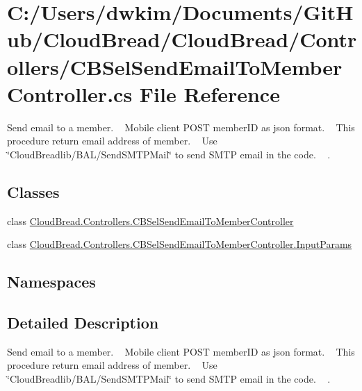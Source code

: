 \hypertarget{a00226}{}\section{C\+:/\+Users/dwkim/\+Documents/\+Git\+Hub/\+Cloud\+Bread/\+Cloud\+Bread/\+Controllers/\+C\+B\+Sel\+Send\+Email\+To\+Member\+Controller.cs File Reference}
\label{a00226}


Send email to a member. ~\newline
Mobile client P\+O\+ST member\+ID as json format. ~\newline
This procedure return email address of member. ~\newline
 Use \char`\"{}\+Cloud\+Breadlib/\+B\+A\+L/\+Send\+S\+M\+T\+P\+Mail\char`\"{} to send S\+M\+TP email in the code. ~\newline
.  


\subsection*{Classes}
\begin{DoxyCompactItemize}
\item 
class \hyperlink{a00055}{Cloud\+Bread.\+Controllers.\+C\+B\+Sel\+Send\+Email\+To\+Member\+Controller}
\item 
class \hyperlink{a00104}{Cloud\+Bread.\+Controllers.\+C\+B\+Sel\+Send\+Email\+To\+Member\+Controller.\+Input\+Params}
\end{DoxyCompactItemize}
\subsection*{Namespaces}
\begin{DoxyCompactItemize}
\end{DoxyCompactItemize}


\subsection{Detailed Description}
Send email to a member. ~\newline
Mobile client P\+O\+ST member\+ID as json format. ~\newline
This procedure return email address of member. ~\newline
 Use \char`\"{}\+Cloud\+Breadlib/\+B\+A\+L/\+Send\+S\+M\+T\+P\+Mail\char`\"{} to send S\+M\+TP email in the code. ~\newline
. 

